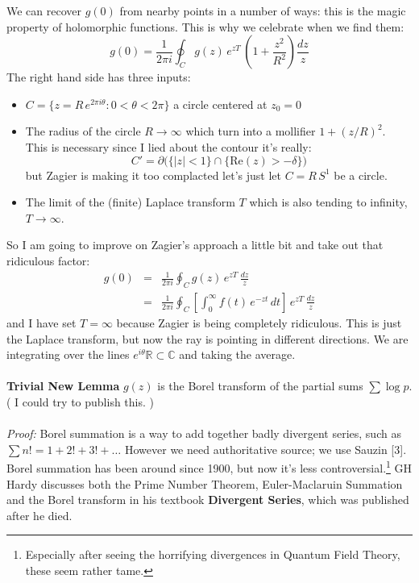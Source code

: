 \documentclass[12pt]{article}
\begin{document}
\newpage

\noindent We can recover $g(0)$ from nearby points in a number of ways: this is the magic property of holomorphic functions.  This is why we celebrate when we find them:
$$ g(0) = \frac{1}{2\pi i } \oint_C g(z) \, e^{zT} \, \left( 1 + \frac{z^2 }{R^2}\right)  \frac{dz}{z}$$
The right hand side has three inputs:
\begin{itemize}
\item $C = \{  z = R \, e^{2\pi i \theta}: 0 < \theta < 2\pi \}$ a circle centered at $z_0 = 0$
\item The radius of the circle $R \to \infty$ which turn into a mollifier $1 + (z/R)^2$. \\
This is necessary since I lied about the contour it's really: 
$$C'= \partial \Big( \{ |z| < 1\} \cap \{ \mathrm{Re}(z) > -\delta \} \Big) $$
but Zagier is making it too complacted let's just let $C = R \, S^1$ be a circle.
\item The limit of the (finite) Laplace transform $T$ which is also tending to infinity, $T \to \infty$.
\end{itemize}
So I am going to improve on Zagier's approach a little bit and take out that ridiculous factor:
\begin{eqnarray*} g(0) &=& \frac{1}{2\pi i } \oint_C g(z) \, e^{zT} \, \frac{dz}{z} \\ 
&=& 
\frac{1}{2\pi i } \oint_C \left[ \int_0^\infty f(t)\, e^{-zt} \, dt 
\right]  \, e^{zT} \, \frac{dz}{z}
\end{eqnarray*}
and I have set $T = \infty$ because Zagier is being completely ridiculous.  This is just the Laplace transform, but now the ray is pointing in different directions.  We are integrating over the lines $ e^{i\theta} \mathbb{R} \subset \mathbb{C} $ and taking the average. \\ \\
\textbf{Trivial New Lemma}  $g(z)$ is the Borel transform of the partial sums $\sum \log p$. ( I could try to publish this. ) \\ \\
\textit{Proof:} Borel summation is a way to add together badly divergent series, such as $\sum n! = 1 + 2! + 3! + \dots $ However we need authoritative source; we use Sauzin [3].  Borel summation has been around since 1900, but now it's less controversial.\footnote{Especially after seeing the horrifying divergences in Quantum Field Theory, these seem rather tame.} GH Hardy discusses both the Prime Number Theorem, Euler-Maclaruin Summation and the Borel transform in his textbook \textbf{Divergent Series}, which was published after he died.
\end{document}

